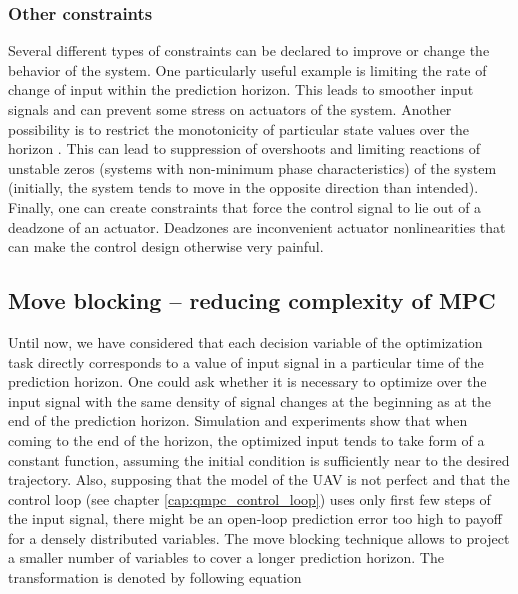 \subsubsection{Other constraints}

Several different types of constraints can be declared to improve or change the behavior of the system. One particularly useful example is limiting the rate of change of input within the prediction horizon. This leads to smoother input signals and can prevent some stress on actuators of the system. Another possibility is to restrict the monotonicity of particular state values over the horizon \citep{rossiter2013mpcpracticalapproach}. This can lead to suppression of overshoots and limiting reactions of unstable zeros (systems with non-minimum phase characteristics) of the system (initially, the system tends to move in the opposite direction than intended). Finally, one can create constraints that force the control signal to lie out of a deadzone of an actuator. Deadzones are inconvenient actuator nonlinearities that can make the control design otherwise very painful.

\subsection{Move blocking -- reducing complexity of MPC}

Until now, we have considered that each decision variable of the optimization task directly corresponds to a value of input signal in a particular time of the prediction horizon. One could ask whether it is necessary to optimize over the input signal with the same density of signal changes at the beginning as at the end of the prediction horizon. Simulation and experiments show that when coming to the end of the horizon, the optimized input tends to take form of a constant function, assuming the initial condition is sufficiently near to the desired trajectory. Also, supposing that the model of the UAV is not perfect and that the control loop (see chapter \ref{cap:qmpc_control_loop}) uses only first few steps of the input signal, there might be an open-loop prediction error too high to payoff for a densely distributed variables. The move blocking technique allows to project a smaller number of variables to cover a longer prediction horizon. The transformation is denoted by following equation

